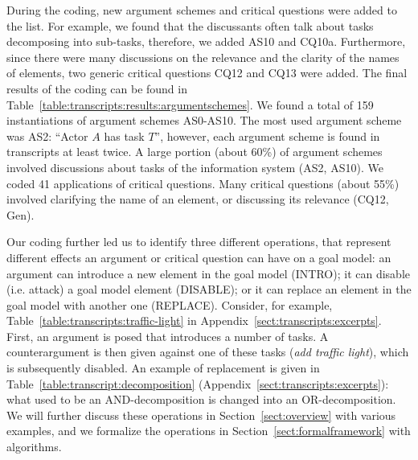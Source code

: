 During the coding, new argument schemes and critical questions were added to the list. For example, we found that the discussants often talk about tasks decomposing into sub-tasks, therefore, we added AS10 and CQ10a. Furthermore, since there were many discussions on the relevance and the clarity of the names of elements, two generic critical questions CQ12 and CQ13 were added. The final results of the coding can be found in Table~\ref{table:transcripts:results:argumentschemes}. We found a total of 159 instantiations of argument schemes AS0-AS10. The most used argument scheme was AS2: ``Actor $A$ has task $T$'', however, each argument scheme is found in transcripts at least twice. A large portion (about 60\%) of argument schemes involved discussions about tasks of the information system (AS2, AS10). We coded 41 applications of critical questions. Many critical questions (about 55\%) involved clarifying the name of an element, or discussing its relevance (CQ12, Gen).

Our coding further led us to identify three different operations, that represent different effects an argument or critical question can have on a goal model: an argument can introduce a new element in the goal model (\textsf{INTRO}); it can disable (i.e. attack) a goal model element (\textsf{DISABLE}); or it can replace an element in the goal model with another one (\textsf{REPLACE}). Consider, for example, Table~\ref{table:transcripts:traffic-light} in Appendix~\ref{sect:transcripts:excerpts}. First, an argument is posed that introduces a number of tasks. A counterargument is then given against one of these tasks (\emph{add traffic light}), which is subsequently disabled. An example of replacement is given in Table~\ref{table:transcript:decomposition} (Appendix~\ref{sect:transcripts:excerpts}): what used to be an AND-decomposition is changed into an OR-decomposition. We will further discuss these operations in Section~\ref{sect:overview} with various examples, and we formalize the operations in Section~\ref{sect:formalframework} with algorithms.